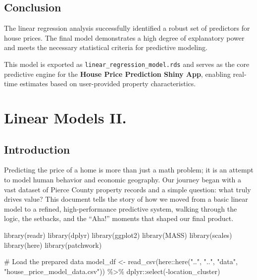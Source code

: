 \documentclass[
  english,
  letterpaper,
  DIV=11,
  numbers=noendperiod]{scrreprt}
\newenvironment{Shaded}{\begin{snugshade}}{\end{snugshade}}
\newcommand{\CommentTok}[1]{\textcolor[rgb]{0.37,0.37,0.37}{#1}}
\newcommand{\FunctionTok}[1]{\textcolor[rgb]{0.28,0.35,0.67}{#1}}
\newcommand{\NormalTok}[1]{\textcolor[rgb]{0.00,0.23,0.31}{#1}}
\newcommand{\OtherTok}[1]{\textcolor[rgb]{0.00,0.23,0.31}{#1}}
\newcommand{\SpecialCharTok}[1]{\textcolor[rgb]{0.37,0.37,0.37}{#1}}
\newcommand{\StringTok}[1]{\textcolor[rgb]{0.13,0.47,0.30}{#1}}
\begin{document}
\section{Conclusion}\label{conclusion}

The linear regression analysis successfully identified a robust set of
predictors for house prices. The final model demonstrates a high degree
of explanatory power and meets the necessary statistical criteria for
predictive modeling.

This model is exported as \texttt{linear\_regression\_model.rds} and
serves as the core predictive engine for the \textbf{House Price
Prediction Shiny App}, enabling real-time estimates based on
user-provided property characteristics.


\chapter{Linear Models II.}\label{linear-models-ii.}

\section{Introduction}\label{introduction-1}

Predicting the price of a home is more than just a math problem; it is
an attempt to model human behavior and economic geography. Our journey
began with a vast dataset of Pierce County property records and a simple
question: what truly drives value? This document tells the story of how
we moved from a basic linear model to a refined, high-performance
predictive system, walking through the logic, the setbacks, and the
``Aha!'' moments that shaped our final product.

\begin{Shaded}
\begin{Highlighting}[]
\FunctionTok{library}\NormalTok{(readr)}
\FunctionTok{library}\NormalTok{(dplyr)}
\FunctionTok{library}\NormalTok{(ggplot2)}
\FunctionTok{library}\NormalTok{(MASS)}
\FunctionTok{library}\NormalTok{(scales)}
\FunctionTok{library}\NormalTok{(here)}
\FunctionTok{library}\NormalTok{(patchwork)}


\CommentTok{\# Load the prepared data}
\NormalTok{model\_df }\OtherTok{\textless{}{-}} \FunctionTok{read\_csv}\NormalTok{(here}\SpecialCharTok{::}\FunctionTok{here}\NormalTok{(}\StringTok{".."}\NormalTok{, }\StringTok{".."}\NormalTok{, }\StringTok{"data"}\NormalTok{, }\StringTok{"house\_price\_model\_data.csv"}\NormalTok{)) }\SpecialCharTok{\%\textgreater{}\%}
\NormalTok{  dplyr}\SpecialCharTok{::}\FunctionTok{select}\NormalTok{(}\SpecialCharTok{{-}}\NormalTok{location\_cluster)}
\end{Highlighting}
\end{Shaded}
\end{document}
